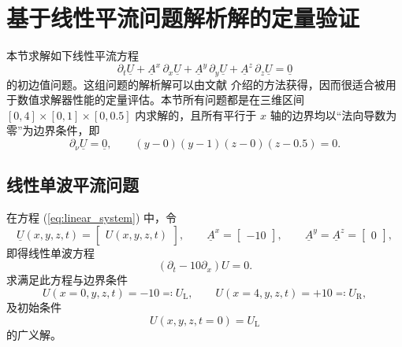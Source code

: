 \section{基于线性平流问题解析解的定量验证}

本节求解如下线性平流方程
\begin{equation}
\partial_{t}\underline{U}+\underline{A}^{x}\,\partial_{x}\underline{U}+\underline{A}^{y}\,\partial_{y}\underline{U}+\underline{A}^{z}\,\partial_{z}\underline{U}=\underline{0}\label{eq:linear_system}
\end{equation}
的初边值问题。这组问题的解析解可以由文献 \cite{Toro_2009} 介绍的方法获得，因而很适合被用于数值求解器性能的定量评估。本节所有问题都是在三维区间
$[0,4]\times[0,1]\times[0,0.5]$ 内求解的，且所有平行于 $x$ 轴的边界均以“法向导数为零”为边界条件，即
\begin{equation}
\partial_{\nu}\underline{U}=\underline{0},\qquad(y-0)(y-1)(z-0)(z-0.5)=0.
\end{equation}


\subsection{线性单波平流问题}
\begin{problem}
[线性单波平流]\label{prob:=007EBF=006027=005355=006CE2=005E73=006D41}在方程
(\ref{eq:linear_system}) 中，令
\begin{equation}
\underline{U}(x,y,z,t)=\begin{bmatrix}U(x,y,z,t)\end{bmatrix},\qquad\underline{A}^{x}=\begin{bmatrix}-10\end{bmatrix},\qquad\underline{A}^{y}=\underline{A}^{z}=\begin{bmatrix}0\end{bmatrix},
\end{equation}
即得线性单波方程
\begin{equation}
\left(\partial_{t}-10\partial_{x}\right)U=0.
\end{equation}
求满足此方程与边界条件
\begin{equation}
U(x=0,y,z,t)=-10\eqqcolon U_{\mathrm{L}},\qquad U(x=4,y,z,t)=+10\eqqcolon U_{\mathrm{R}},
\end{equation}
及初始条件
\begin{equation}
U(x,y,z,t=0)=U_{\mathrm{L}}
\end{equation}
的广义解。
\end{problem}

